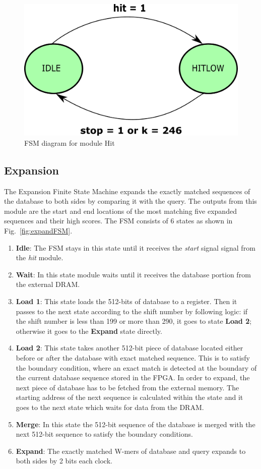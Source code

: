 \begin{figure}[t!]
\centering
\includegraphics[width=0.7\columnwidth]{Figures/hitFSM.pdf}
\caption{FSM diagram for module Hit} \label{fig:hitFSM}
\end{figure}



\subsection{Expansion}
The Expansion Finite State Machine expands the exactly matched sequences of the database to both sides by comparing it with the query. 
The outputs from this module are the start and end locations of the most matching five expanded sequences and their high scores. The FSM consists of 6 states as shown in Fig.~\ref{fig:expandFSM}.

\begin{enumerate}
  \item \textbf{Idle}: The FSM stays in this state until it receives the \textit{start} signal signal from the \textit{hit} module.
  \item \textbf{Wait}: In this state module waits until it receives the database portion from the external DRAM.
  \item \textbf{Load 1}: This state loads the 512-bits of database to a register. Then it passes to the next state according to the shift number by following logic: if the shift number is less than 199 or more than 290, it goes to state \textbf{Load 2}; otherwise it goes to the \textbf{Expand} state directly. 
  \item \textbf{Load 2}: This state takes another 512-bit piece of database located either before or after the database with exact matched sequence. This is to satisfy the boundary condition, where an exact match is detected at the boundary of the current database sequence stored in the FPGA. In order to expand, the next piece of database has to be fetched from the external memory. 
The starting address of the next sequence is calculated within the state and it goes to the next state which waits for data from the DRAM. 
  \item \textbf{Merge}: In this state the 512-bit sequence of the database is merged with the next 512-bit sequence to satisfy the boundary conditions.
  \item \textbf{Expand}: The exactly matched W-mers of database and query expands to both sides by 2 bits each clock.
\end{enumerate}


